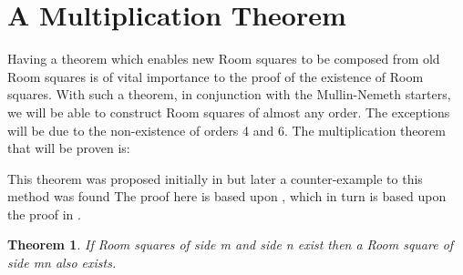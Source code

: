 \documentclass[11pt, a4paper]{book}\usepackage[]{graphicx}\usepackage[]{xcolor}
\newcounter{example}
\newtheorem{theorem}{Theorem}
\begin{document}
\section{A Multiplication Theorem}

Having a theorem which enables new Room squares to be
composed from old Room squares is of vital importance to the
proof of the existence of Room squares. With such a theorem,
in conjunction with the Mullin-Nemeth starters, we will be
able to construct Room squares of almost any order.  The
exceptions will be due to the non-existence of orders 4 and
6. The multiplication theorem that will be proven is:

This theorem was proposed initially in
\cite{bruckWhatLoop1963}
but later a
counter-example to this method was found
\cite{mullinCounterexampleDirectProduct1969}
The proof
here is based upon
\cite{andersonCombinatorialDesignsConstruction1990},
which in turn is based upon the proof in
\cite{stantonMultiplicationTheoremRoom1972a}.

\begin{theorem}
\label{thm:multiply}
If Room squares of side m and side n exist then a Room
square of side mn also exists.
\end{theorem}
\end{document}
